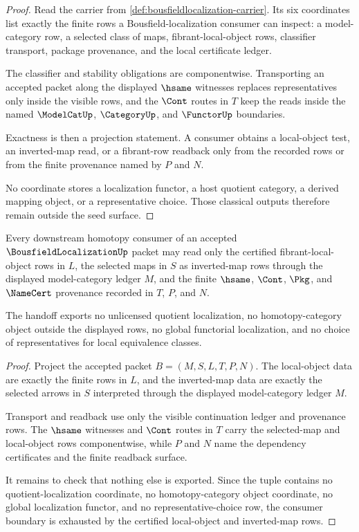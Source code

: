 \begin{proof}
Read the carrier from \autoref{def:bousfieldlocalization-carrier}. Its six coordinates list exactly the finite rows a Bousfield-localization consumer can inspect: a model-category row, a selected class of maps, fibrant-local-object rows, classifier transport, package provenance, and the local certificate ledger.

The classifier and stability obligations are componentwise. Transporting an accepted packet along the displayed $\hsame$ witnesses replaces representatives only inside the visible rows, and the $\Cont$ routes in $T$ keep the reads inside the named $\ModelCatUp$, $\CategoryUp$, and $\FunctorUp$ boundaries.

Exactness is then a projection statement. A consumer obtains a local-object test, an inverted-map read, or a fibrant-row readback only from the recorded rows or from the finite provenance named by $P$ and $N$.

No coordinate stores a localization functor, a host quotient category, a derived mapping object, or a representative choice. Those classical outputs therefore remain outside the seed surface.
\end{proof}

\begin{theorem}
\label{thm:bousfieldlocalization-local-object-handoff}
Every downstream homotopy consumer of an accepted $\BousfieldLocalizationUp$ packet may read only the certified fibrant-local-object rows in $L$, the selected maps in $S$ as inverted-map rows through the displayed model-category ledger $M$, and the finite $\hsame$, $\Cont$, $\Pkg$, and $\NameCert$ provenance recorded in $T$, $P$, and $N$.

The handoff exports no unlicensed quotient localization, no homotopy-category object outside the displayed rows, no global functorial localization, and no choice of representatives for local equivalence classes.
\end{theorem}
\begin{proof}
Project the accepted packet $B=(M,S,L,T,P,N)$. The local-object data are exactly the finite rows in $L$, and the inverted-map data are exactly the selected arrows in $S$ interpreted through the displayed model-category ledger $M$.

Transport and readback use only the visible continuation ledger and provenance rows. The $\hsame$ witnesses and $\Cont$ routes in $T$ carry the selected-map and local-object rows componentwise, while $P$ and $N$ name the dependency certificates and the finite readback surface.

It remains to check that nothing else is exported. Since the tuple contains no quotient-localization coordinate, no homotopy-category object coordinate, no global localization functor, and no representative-choice row, the consumer boundary is exhausted by the certified local-object and inverted-map rows.
\end{proof}

